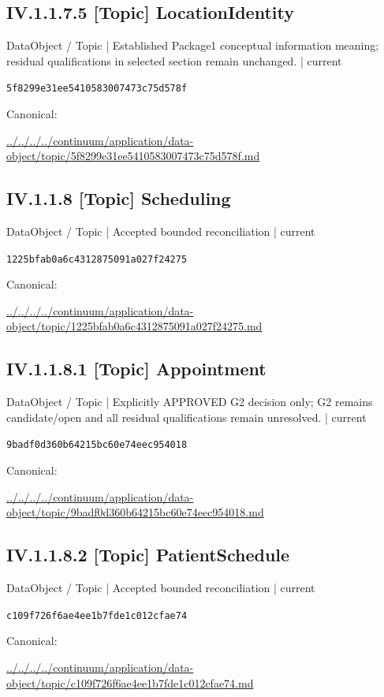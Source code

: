 \documentclass[10pt,a4paper]{article}
\begin{document}
\subsection*{IV.1.1.7.5 [Topic] LocationIdentity}
{\small DataObject / Topic | Established Package1 conceptual information meaning; residual qualifications in selected section remain unchanged. | current}\par
\texttt{5f8299e31ee5410583007473c75d578f}\par
Canonical: \par
{\footnotesize\url{../../../../continuum/application/data-object/topic/5f8299e31ee5410583007473c75d578f.md}}\par
\subsection*{IV.1.1.8 [Topic] Scheduling}
{\small DataObject / Topic | Accepted bounded reconciliation | current}\par
\texttt{1225bfab0a6c4312875091a027f24275}\par
Canonical: \par
{\footnotesize\url{../../../../continuum/application/data-object/topic/1225bfab0a6c4312875091a027f24275.md}}\par
\subsection*{IV.1.1.8.1 [Topic] Appointment}
{\small DataObject / Topic | Explicitly APPROVED G2 decision only; G2 remains candidate/open and all residual qualifications remain unresolved. | current}\par
\texttt{9badf0d360b64215bc60e74eec954018}\par
Canonical: \par
{\footnotesize\url{../../../../continuum/application/data-object/topic/9badf0d360b64215bc60e74eec954018.md}}\par
\subsection*{IV.1.1.8.2 [Topic] PatientSchedule}
{\small DataObject / Topic | Accepted bounded reconciliation | current}\par
\texttt{c109f726f6ae4ee1b7fde1c012cfae74}\par
Canonical: \par
{\footnotesize\url{../../../../continuum/application/data-object/topic/c109f726f6ae4ee1b7fde1c012cfae74.md}}\par
\end{document}
